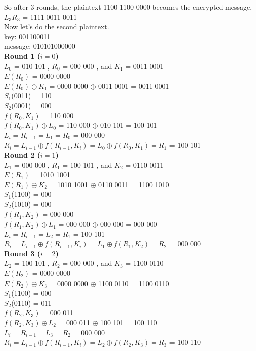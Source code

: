 \documentclass[12pt,letterpaper,final]{report}
\begin{document}
So after 3 rounds, the plaintext 1100 1100 0000 becomes the encrypted message, $L_3R_3$ = 1111 0011 0011 \\

Now let's do the second plaintext. \\ 

key: 001100011 \\
message: 010101000000 \\

\textbf{Round 1 ($i = 0$) } \\

$L_0$ = 010 101 ,
$R_0$ = 000 000 , and 
$K_1$ = 0011 0001 \\
$E(R_0)$ = 0000 0000 \\
$E(R_0)  \oplus K_1 $  = 0000 0000 $ \oplus $ 0011 0001 = 0011 0001 \\
$S_1$(0011) = 110 \\
$S_2$(0001) = 000 \\
$f(R_0,K_1)$ = 110 000 \\
$f(R_0,K_1)  \oplus  L_0$ = 110 000 $ \oplus $ 010 101 = 100 101 \\
$L_i = R_{i-1} = L_1 = R_0$ = 000 000\\
$R_i = L_{i-1} \oplus f(R_{i-1},K_i) = L_0 \oplus f(R_0,K_1) = R_1$ = 100 101 \\


\textbf{Round 2 ($i = 1$) } \\

$L_1$ = 000 000 ,
$R_1$ = 100 101 , and 
$K_2$ = 0110 0011 \\
$E(R_1)$ = 1010 1001 \\
$E(R_1)  \oplus K_2 $  = 1010 1001 $ \oplus $ 0110 0011 = 1100 1010 \\
$S_1$(1100) = 000 \\
$S_2$(1010) = 000 \\
$f(R_1,K_2)$ = 000 000 \\
$f(R_1,K_2)  \oplus  L_1$ = 000 000 $ \oplus $ 000 000 = 000 000 \\
$L_i = R_{i-1} = L_2 = R_1$ = 100 101\\
$R_i = L_{i-1} \oplus f(R_{i-1},K_i) = L_1 \oplus f(R_1,K_2) = R_2$ = 000 000 \\


\textbf{Round 3 ($i = 2$) } \\

$L_2$ = 100 101 ,
$R_2$ = 000 000 , and 
$K_3$ =  1100 0110 \\
$E(R_2)$ = 0000 0000 \\
$E(R_2)  \oplus K_3 $  = 0000 0000 $ \oplus $ 1100 0110 = 1100 0110 \\
$S_1$(1100) = 000 \\
$S_2$(0110) = 011 \\
$f(R_2,K_3)$ = 000 011 \\
$f(R_2,K_3)  \oplus  L_2$ = 000 011 $ \oplus $ 100 101 = 100 110 \\
$L_i = R_{i-1} = L_3 = R_2$ = 000 000 \\
$R_i = L_{i-1} \oplus f(R_{i-1},K_i) = L_2 \oplus f(R_2,K_3) = R_3$ = 100 110 \\
\end{document}
